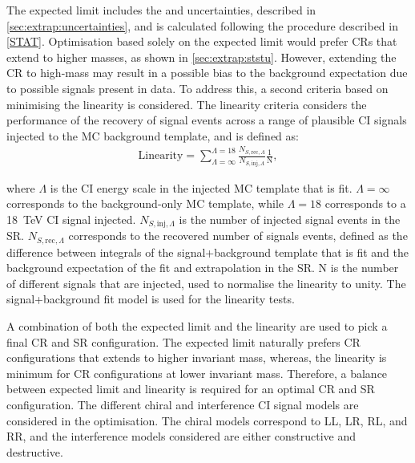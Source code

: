 The expected limit includes the \ISSU and \STATU uncertainties, described in \cref{sec:extrap:uncertainties}, and is calculated following the procedure described in \cref{STAT}. Optimisation based solely on the expected limit would prefer CRs that extend to higher masses, as shown in \cref{sec:extrap:ststu}. However, extending the CR to high-mass may result in a possible bias to the background expectation due to possible signals present in data. To address this, a second criteria based on minimising the linearity is considered. The linearity criteria considers the performance of the recovery of signal events across a range of plausible CI signals injected to the MC background template, and is defined as: 
\begin{equation}
    \label{eq:linearity}
    \begin{aligned}
        \mathrm{Linearity} = \sum^{\Lambda = 18}_{\Lambda = \infty} \frac{N_{S,\mathrm{rec},\Lambda}}{N_{S,\mathrm{inj},\Lambda}}  \frac{1}{\mathrm{N}},
    \end{aligned}
\end{equation}

where $\Lambda$ is the CI energy scale in the injected MC template that is fit. $\Lambda = \infty$ corresponds to the background-only MC template, while $\Lambda = 18$ corresponds to a \SI{18}{\tera\electronvolt} CI signal injected. $N_{S,\mathrm{inj},\Lambda}$ is the number of injected signal events in the SR. $N_{S,\mathrm{rec},\Lambda}$ corresponds to the recovered number of signals events, defined as the difference between integrals of the signal+background template that is fit and the background expectation of the fit and extrapolation in the SR. N is the number of different signals that are injected, used to normalise the linearity to unity. The signal+background fit model is used for the linearity tests. 

A combination of both the expected limit and the linearity are used to pick a final CR and SR configuration. The expected limit naturally prefers CR configurations that extends to higher invariant mass, whereas, the linearity is minimum for CR configurations at lower invariant mass. Therefore, a balance between expected limit and linearity is required for an optimal CR and SR configuration. The different chiral and interference CI signal models are considered in the optimisation. The chiral models correspond to LL, LR, RL, and RR, and the interference models considered are either constructive and destructive. 

